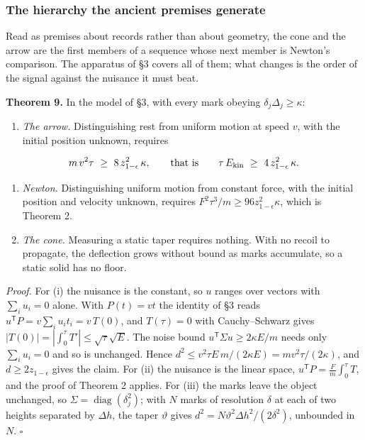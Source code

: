 \documentclass[11pt,a4paper]{article}
\newcommand{\tightlist}{\setlength{\itemsep}{0pt}\setlength{\parskip}{0pt}}
\begin{document}
\hypertarget{the-hierarchy-the-ancient-premises-generate}{%
\subsubsection{The hierarchy the ancient premises
generate}\label{the-hierarchy-the-ancient-premises-generate}}

Read as premises about records rather than about geometry, the cone and
the arrow are the first members of a sequence whose next member is
Newton's comparison. The apparatus of §3 covers all of them; what
changes is the order of the signal against the nuisance it must beat.

\textbf{Theorem 9.} In the model of §3, with every mark obeying
\(\delta_j\Delta_j\ge\kappa\):

\begin{enumerate}
\def\labelenumi{(\roman{enumi})}
\tightlist
\item
  \emph{The arrow.} Distinguishing rest from uniform motion at speed
  \(v\), with the initial position unknown, requires
\end{enumerate}

\[m\,v^2\tau\ \ge\ 8\,z_{1-\epsilon}^2\,\kappa,
\qquad\text{that is}\qquad \tau\,E_{\rm kin}\ \ge\ 4\,z_{1-\epsilon}^2\,\kappa .\]

\begin{enumerate}
\def\labelenumi{(\roman{enumi})}
\setcounter{enumi}{1}
\item
  \emph{Newton.} Distinguishing uniform motion from constant force, with
  the initial position and velocity unknown, requires
  \(F^2\tau^3/m\ge96z_{1-\epsilon}^2\kappa\), which is Theorem 2.
\item
  \emph{The cone.} Measuring a static taper requires nothing. With no
  recoil to propagate, the deflection grows without bound as marks
  accumulate, so a static solid has no floor.
\end{enumerate}

\emph{Proof.} For (i) the nuisance is the constant, so \(u\) ranges over
vectors with \(\sum_iu_i=0\) alone. With \(P(t)=vt\) the identity of §3
reads \(u^{\mathsf T}P=v\sum_iu_it_i=v\,T(0)\), and \(T(\tau)=0\) with
Cauchy--Schwarz gives \(|T(0)|=|\int_0^\tau T'|\le\sqrt\tau\sqrt E\).
The noise bound \(u^{\mathsf T}\Sigma u\ge2\kappa E/m\) needs only
\(\sum_iu_i=0\) and so is unchanged. Hence
\(d^2\le v^2\tau E\,m/(2\kappa E)=m v^2\tau/(2\kappa)\), and
\(d\ge2z_{1-\epsilon}\) gives the claim. For (ii) the nuisance is the
linear space, \(u^{\mathsf T}P=\frac Fm\int_0^\tau T\), and the proof of
Theorem 2 applies. For (iii) the marks leave the object unchanged, so
\(\Sigma=\operatorname{diag}(\delta_j^2)\); with \(N\) marks of
resolution \(\delta\) at each of two heights separated by \(\Delta h\),
the taper \(\vartheta\) gives
\(d^2=N\vartheta^2\Delta h^2/(2\delta^2)\), unbounded in \(N\).
\(\square\)
\end{document}
